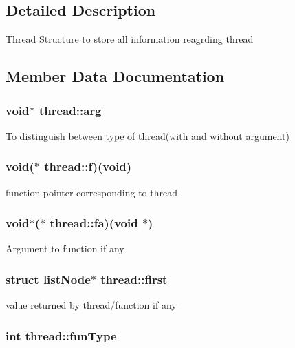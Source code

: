 \subsection{Detailed Description}
Thread Structure to store all information reagrding thread 

\subsection{Member Data Documentation}
\hypertarget{structthread_a7b848d8a51a51c7c499c4bd2caa78019}{
\subsubsection[{arg}]{\setlength{\rightskip}{0pt plus 5cm}void$\ast$ thread\+::arg}}\label{structthread_a7b848d8a51a51c7c499c4bd2caa78019}
To distinguish between type of \hyperlink{structthread}{thread(with and without argument)} \hypertarget{structthread_a5599cb1af1d8c28fe2b3ca909fc25423}{
\subsubsection[{f}]{\setlength{\rightskip}{0pt plus 5cm}void($\ast$ thread\+::f)(void)}}\label{structthread_a5599cb1af1d8c28fe2b3ca909fc25423}
function pointer corresponding to thread \hypertarget{structthread_afd0af41c9ba85bd94ef987b929d92476}{
\subsubsection[{fa}]{\setlength{\rightskip}{0pt plus 5cm}void$\ast$($\ast$ thread\+::fa)(void $\ast$)}}\label{structthread_afd0af41c9ba85bd94ef987b929d92476}
Argument to function if any \hypertarget{structthread_ae831c71a3ca32deabbb8868b6c5b6966}{
\subsubsection[{first}]{\setlength{\rightskip}{0pt plus 5cm}struct {\bf list\+Node}$\ast$ thread\+::first}}\label{structthread_ae831c71a3ca32deabbb8868b6c5b6966}
value returned by thread/function if any \hypertarget{structthread_a5f7295a3b573a531fc61af5e92fbf899}{
\subsubsection[{fun\+Type}]{\setlength{\rightskip}{0pt plus 5cm}int thread\+::fun\+Type}}\label{structthread_a5f7295a3b573a531fc61af5e92fbf899}

